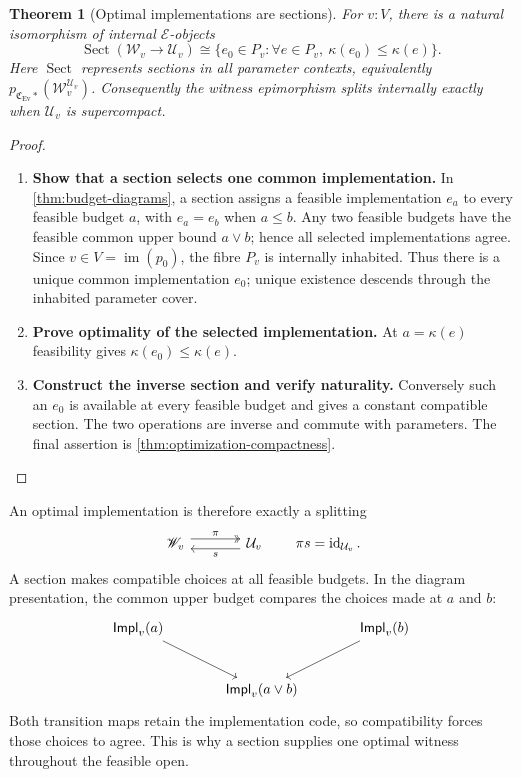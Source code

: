 \documentclass[11pt,a4paper]{article}
\numberwithin{algorithm}{section}
\numberwithin{equation}{section}
\newtheorem{theorem}{Theorem}[section]
\theoremstyle{definition}
\theoremstyle{remark}
\theoremstyle{plain}
\newcommand{\E}{\mathcal E}
\newcommand{\id}{\operatorname{id}}
\newcommand{\Ev}{{\operatorname{Ev}}}
\newcommand{\im}{\operatorname{im}}
\newcommand{\Cplx}{\mathfrak C_{\Ev}}
\theoremstyle{definition}
\theoremstyle{plain}
\begin{document}
\begin{theorem}[Optimal implementations are sections]
\label{thm:optimal-sections}
For $v:V$, there is a natural isomorphism of internal $\E$-objects
\begin{equation}\label{eq:optimal-sections}
 \operatorname{Sect}(\mathscr W_v\to\mathcal U_v)
 \cong\{e_0\in P_v:\forall e\in P_v,\
                         \kappa(e_0)\le\kappa(e)\}.
\end{equation}
Here $\operatorname{Sect}$ represents sections in all parameter
contexts, equivalently $p_{\Cplx*}(\mathscr W_v^{\mathcal U_v})$.
Consequently the witness epimorphism splits internally exactly
when $\mathcal U_v$ is supercompact.
\end{theorem}
\begin{proof}\leavevmode
\begin{enumerate}[leftmargin=*,align=left]
\item \textbf{Show that a section selects one common implementation.}
In \cref{thm:budget-diagrams}, a section assigns a feasible
implementation $e_a$ to every feasible budget $a$, with
$e_a=e_b$ when $a\le b$. Any two feasible budgets have the
feasible common upper bound $a\vee b$; hence all selected
implementations agree. Since $v\in V=\im(p_0)$, the fibre
$P_v$ is internally inhabited. Thus there is a unique common
implementation $e_0$; unique existence descends through the
inhabited parameter cover.

\item \textbf{Prove optimality of the selected implementation.}
At $a=\kappa(e)$
feasibility gives $\kappa(e_0)\le\kappa(e)$.

\item \textbf{Construct the inverse section and verify naturality.}
Conversely such an $e_0$ is available at every feasible budget
and gives a constant compatible section. The two operations
are inverse and commute with parameters. The final assertion
is \cref{thm:optimization-compactness}.
\end{enumerate}
\end{proof}


An optimal implementation is therefore exactly a splitting
\[
\begin{tikzcd}[column sep=large]
 \mathscr W_v \arrow[r,two heads,shift left=.8ex,"{\pi}"]
   & \mathcal U_v \arrow[l,shift left=.8ex,"{s}"]
\end{tikzcd}
\qquad \pi s=\id_{\mathcal U_v}.
\]
A section makes compatible choices at all feasible budgets.
In the diagram presentation, the common upper budget compares
the choices made at $a$ and $b$:
\[
\begin{tikzcd}[column sep=large,row sep=large]
 \mathsf{Impl}_v(a) \arrow[dr]
   && \mathsf{Impl}_v(b) \arrow[dl]\\
 & \mathsf{Impl}_v(a\vee b) &
\end{tikzcd}
\]
Both transition maps retain the implementation code, so compatibility
forces those choices to agree. This is why a section supplies one
optimal witness throughout the feasible open.
\end{document}
